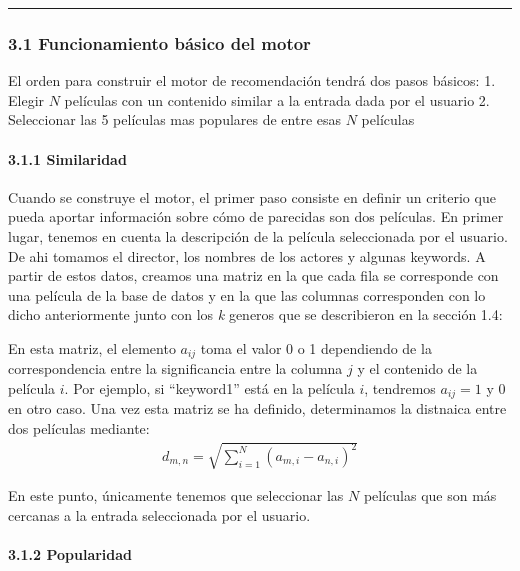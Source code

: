     \begin{center}\rule{0.5\linewidth}{0.5pt}\end{center}

\hypertarget{funcionamiento-buxe1sico-del-motor}{%
\subsubsection{3.1 Funcionamiento básico del
motor}\label{funcionamiento-buxe1sico-del-motor}}

El orden para construir el motor de recomendación tendrá dos pasos
básicos: 1. Elegir \(N\) películas con un contenido similar a la entrada
dada por el usuario 2. Seleccionar las 5 películas mas populares de
entre esas \(N\) películas

\hypertarget{similaridad}{%
\paragraph{3.1.1 Similaridad}\label{similaridad}}

Cuando se construye el motor, el primer paso consiste en definir un
criterio que pueda aportar información sobre cómo de parecidas son dos
películas. En primer lugar, tenemos en cuenta la descripción de la
película seleccionada por el usuario. De ahi tomamos el director, los
nombres de los actores y algunas keywords. A partir de estos datos,
creamos una matriz en la que cada fila se corresponde con una película
de la base de datos y en la que las columnas corresponden con lo dicho
anteriormente junto con los \emph{k} generos que se describieron en la
sección 1.4:

    En esta matriz, el elemento \(a_{ij}\) toma el valor 0 o 1 dependiendo
de la correspondencia entre la significancia entre la columna \(j\) y el
contenido de la película \(i\). Por ejemplo, si ``keyword1'' está en la
película \(i\), tendremos \(a_{ij} = 1\) y \(0\) en otro caso. Una vez
esta matriz se ha definido, determinamos la distnaica entre dos
películas mediante: \begin{eqnarray}
d_{m, n} = \sqrt{  \sum_{i = 1}^{N} \left( a_{m,i}  - a_{n,i} \right)^2  } 
\end{eqnarray}

En este punto, únicamente tenemos que seleccionar las \(N\) películas
que son más cercanas a la entrada seleccionada por el usuario.

\hypertarget{popularidad}{%
\paragraph{3.1.2 Popularidad}\label{popularidad}}

